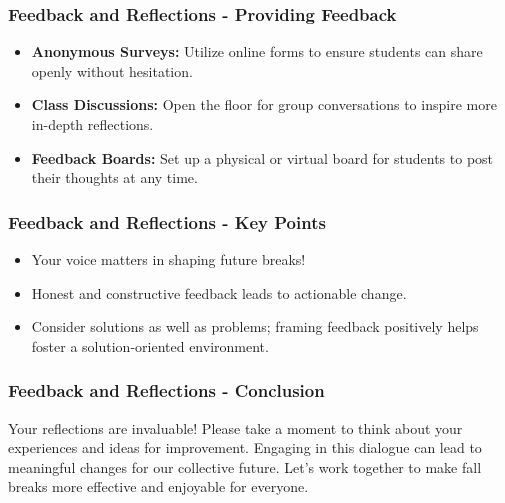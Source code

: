 \documentclass[aspectratio=169]{beamer}
\begin{document}
\begin{frame}[fragile]
    \frametitle{Feedback and Reflections - Providing Feedback}
    \begin{itemize}
        \item \textbf{Anonymous Surveys:} Utilize online forms to ensure students can share openly without hesitation.
        \item \textbf{Class Discussions:} Open the floor for group conversations to inspire more in-depth reflections.
        \item \textbf{Feedback Boards:} Set up a physical or virtual board for students to post their thoughts at any time.
    \end{itemize}
\end{frame}

\begin{frame}[fragile]
    \frametitle{Feedback and Reflections - Key Points}
    \begin{itemize}
        \item Your voice matters in shaping future breaks!
        \item Honest and constructive feedback leads to actionable change.
        \item Consider solutions as well as problems; framing feedback positively helps foster a solution-oriented environment.
    \end{itemize}
\end{frame}

\begin{frame}[fragile]
    \frametitle{Feedback and Reflections - Conclusion}
    Your reflections are invaluable! Please take a moment to think about your experiences and ideas for improvement. Engaging in this dialogue can lead to meaningful changes for our collective future. Let's work together to make fall breaks more effective and enjoyable for everyone.
\end{frame}
\end{document}
